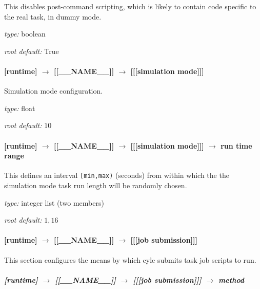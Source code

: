 This disables post-command scripting, which is likely to contain code
specific to the real task, in dummy mode. 

\begin{myitemize}
\item {\em type:} boolean
\item {\em root default:} True
\end{myitemize}

\paragraph[{[[[}simulation mode{]]]}]{[runtime] $\rightarrow$ [[\_\_NAME\_\_]] $\rightarrow$ [[[simulation mode]]]}

Simulation mode configuration.

\begin{myitemize}
\item {\em type:} float
\item {\em root default:} $10$
\end{myitemize}

\paragraph[run time range]{[runtime] $\rightarrow$ [[\_\_NAME\_\_]] $\rightarrow$ [[[simulation mode]]] $\rightarrow$ run time range}

This defines an interval \lstinline=[min,max)= (seconds) from within
which the the simulation mode task run length will be randomly chosen.

\begin{myitemize}
\item {\em type:} integer list (two members)
\item {\em root default:} $1,16$
\end{myitemize}

\paragraph[{[[[}job submission{]]]}]{[runtime] $\rightarrow$ [[\_\_NAME\_\_]] $\rightarrow$ [[[job submission]]]}

This section configures the means by which cylc submits task job scripts to run.

\subparagraph[method]{[runtime] $\rightarrow$ [[\_\_NAME\_\_]] $\rightarrow$ [[[job submission]]] $\rightarrow$ method}
\label{RuntimeJobSubMethods}

